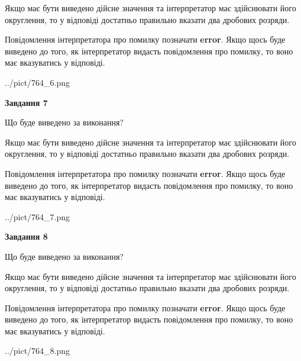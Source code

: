 \documentclass[12pt, ukrainian]{article}
\begin{document}
{\begin {Large}
Якщо має бути виведено дійсне значення та інтерпретатор має здійснювати його округлення, 
то у відповіді достатньо правильно вказати два дробових розряди.

Повідомлення інтерпретатора про помилку позначати \textbf{error}.
Якщо щось буде виведено до того, як інтерпретатор видасть повідомлення про помилку, 
то воно має вказуватись у відповіді. \par

\begin{center}
	{../pict/764_6.png}
\end{center}
\newpage

{\begin {center}\textbf{Завдання 7}\end {center}}\par
Що буде виведено за виконання? \par

Якщо має бути виведено дійсне значення та інтерпретатор має здійснювати його округлення, 
то у відповіді достатньо правильно вказати два дробових розряди.

Повідомлення інтерпретатора про помилку позначати \textbf{error}.
Якщо щось буде виведено до того, як інтерпретатор видасть повідомлення про помилку, 
то воно має вказуватись у відповіді. \par

\begin{center}
	{../pict/764_7.png}
\end{center}
\newpage

{\begin {center}\textbf{Завдання 8}\end {center}}\par
Що буде виведено за виконання? \par

Якщо має бути виведено дійсне значення та інтерпретатор має здійснювати його округлення, 
то у відповіді достатньо правильно вказати два дробових розряди.

Повідомлення інтерпретатора про помилку позначати \textbf{error}.
Якщо щось буде виведено до того, як інтерпретатор видасть повідомлення про помилку, 
то воно має вказуватись у відповіді. \par

\begin{center}
	{../pict/764_8.png}
\end{center}
\newpage


\end{Large}}
\end{document}
